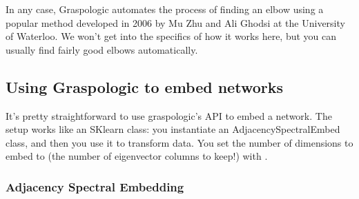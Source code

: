 \documentclass[letterpaper,10pt,english]{jupyterBook}
\begin{document}
\sphinxAtStartPar
In any case, Graspologic automates the process of finding an elbow using a popular method developed in 2006 by Mu Zhu and Ali Ghodsi at the University of Waterloo. We won’t get into the specifics of how it works here, but you can usually find fairly good elbows automatically.


\subsection{Using Graspologic to embed networks}
\label{\detokenize{representations/ch6/spectral-embedding:using-graspologic-to-embed-networks}}
\sphinxAtStartPar
It’s pretty straightforward to use graspologic’s API to embed a network. The setup works like an SKlearn class: you instantiate an AdjacencySpectralEmbed class, and then you use it to transform data. You set the number of dimensions to embed to (the number of eigenvector columns to keep!) with .


\subsubsection{Adjacency Spectral Embedding}
\label{\detokenize{representations/ch6/spectral-embedding:adjacency-spectral-embedding}}
\begin{sphinxVerbatim}[commandchars=\\\{\}]
     

  \PYG{p}{[}\PYG{p}{[} \PYG{p}{]} 
              \PYG{p}{[} \PYG{p}{]}\PYG{p}{]}
  \PYG{p}{[} \PYG{p}{]}
     

  
  
\end{sphinxVerbatim}
\end{document}
